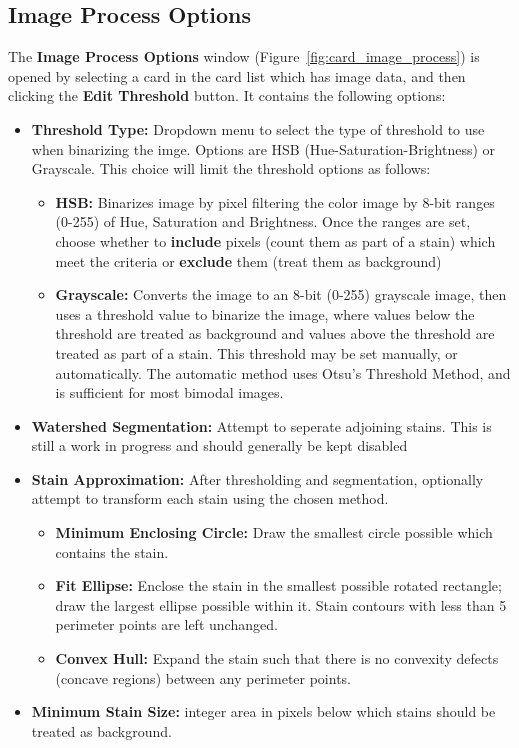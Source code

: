 \documentclass[10pt,letterpaper,titlepage]{article}
\begin{document}
    \subsection{Image Process Options}
    \label{sec:image_process}
    The \textbf{Image Process Options} window (Figure~\ref{fig:card_image_process}) is opened by selecting a card in the card list which has image data, and then clicking the \textbf{Edit Threshold} button. It contains the following options:
    \begin{itemize}
        \item \textbf{Threshold Type:} Dropdown menu to select the type of threshold to use when binarizing the imge. Options are HSB (Hue-Saturation-Brightness) or Grayscale. This choice will limit the threshold options as follows:
        \begin{itemize}
            \item \textbf{HSB:} Binarizes image by pixel filtering the color image by 8-bit ranges (0-255) of Hue, Saturation and Brightness. Once the ranges are set, choose whether to \textbf{include} pixels (count them as part of a stain) which meet the criteria or \textbf{exclude} them (treat them as background)
            \item \textbf{Grayscale:} Converts the image to an 8-bit (0-255) grayscale image, then uses a threshold value to binarize the image, where values below the threshold are treated as background and values above the threshold are treated as part of a stain. This threshold may be set manually, or automatically. The automatic method uses Otsu's Threshold Method, and is sufficient for most bimodal images.
        \end{itemize}
        \item \textbf{Watershed Segmentation:} Attempt to seperate adjoining stains. \color{red} This is still a work in progress and should generally be kept disabled \color{black}
        \item \textbf{Stain Approximation:} After thresholding and segmentation, optionally attempt to transform each stain using the chosen method.
        \begin{itemize}
            \item \textbf{Minimum Enclosing Circle:} Draw the smallest circle possible which contains the stain.
            \item \textbf{Fit Ellipse:} Enclose the stain in the smallest possible rotated rectangle; draw the largest ellipse possible within it. Stain contours with less than 5 perimeter points are left unchanged.
            \item \textbf{Convex Hull:} Expand the stain such that there is no convexity defects (concave regions) between any perimeter points.
        \end{itemize}
        \item \textbf{Minimum Stain Size:} integer area in pixels below which stains should be treated as background.
    \end{itemize}
\end{document}
